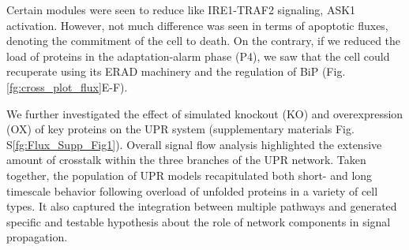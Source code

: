 \documentclass[fleqn,10pt]{wlscirep}
\begin{document}
Certain modules were seen to reduce like IRE1-TRAF2 signaling, ASK1 activation. However, not much difference was seen in terms of apoptotic fluxes, denoting the commitment of the cell to death. On the contrary, if we reduced the load of proteins in the adaptation-alarm phase (P4), we saw that the cell could recuperate using its ERAD machinery and the regulation of BiP (Fig. \ref{fg:cross_plot_flux}E-F). 

We further investigated the effect of simulated knockout (KO) and overexpression (OX) of key proteins on the UPR system
(supplementary materials Fig. S\ref{fg:Flux_Supp_Fig1}).
Overall signal flow analysis highlighted the extensive amount of crosstalk within the three branches of the UPR network. Taken together, the population of UPR models recapitulated both short- and long timescale behavior following overload of unfolded proteins in a variety of cell types. It also captured the integration between multiple pathways and generated specific and testable hypothesis about the role of network components in signal propagation.    
\end{document}

